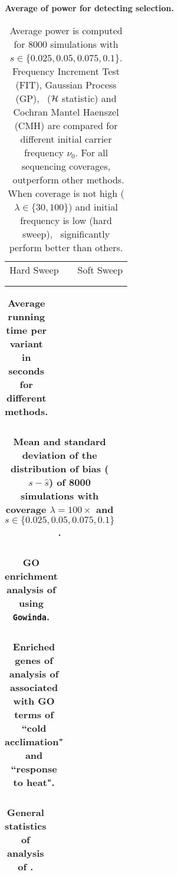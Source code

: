
\begin{table}[H]
	\centering
		\caption{\bf Average of power for detecting selection.}
	\begin{tabular}{ccc}
		Hard Sweep & &Soft Sweep\\ \\  
		
		&&
	\end{tabular}
	\caption*{		Average power is computed  for 8000 simulations 
	with 
		$s\in\{0.025,0.05,0.075,0.1\}$. Frequency Increment 
		Test (FIT), Gaussian Process (GP), \comale\ (${\cal H}$ statistic) and 
		Cochran Mantel Haenszel (CMH) are compared for different initial 
		carrier frequency $\nu_0$. For all sequencing coverages, \comale\ 
		outperform other methods. When coverage is not high 
		($\lambda\in\{30,100\}$) and initial frequency is low (hard sweep), 
		\comale\ significantly perform better than others.}
	\label{tab:power}
\end{table}


\begin{table}[H]
	\centering
		\caption{\bf Average running time per variant in seconds for 
		different 
			methods.}
	\begin{tabular}{c}
		
	\end{tabular}
\label{tab:times}
\end{table}

\begin{table}[h]
	\centering
	\caption{\bf Mean and standard deviation of the distribution of 
	bias 
		($s-\hat{s}$) of 8000 simulations with coverage 
		$\lambda=100\times$ and 
		$s\in\{0.025,0.05,0.075,0.1\}$.}
	\begin{tabular}{c}
		
	\end{tabular}
	\label{tab:biasdist}
\end{table}

\clearpage
\newpage
\begin{table}[H]
	\centering
	\caption{\bf GO enrichment analysis of \datadm using 
		\texttt{Gowinda}.}
	\begin{tabular}{c}
		
	\end{tabular}
	\label{tab:gowinda}
\end{table}
\newpage

\begin{table}[H]
	\centering
		\caption{\bf Enriched genes of analysis of \datadm associated 
		with GO 
		terms 
			of 
			``cold acclimation" and ``response to heat".}
	\begin{tabular}{c}
		
	\end{tabular}
\label{tab:tempGenes}
\end{table}

\begin{table}[H]
	\centering
		\caption{\bf General statistics of analysis of \datadm.}
	\begin{tabular}{c}
		
	\end{tabular}
\label{tab:stats}
\end{table}
